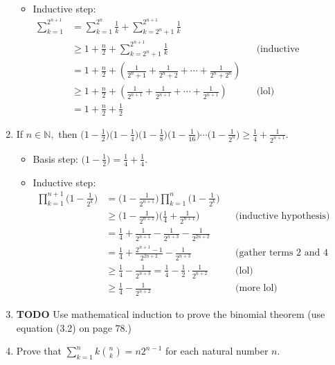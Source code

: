 \documentclass[11pt, oneside]{amsart}
\begin{document}
\begin{enumerate}
\begin{itemize}
\item Inductive step: 
\begin{align*}
\sum_{k=1}^{2^{n+1}} &=  \sum_{k=1}^{2^n} \frac{1}{k} + \sum_{k=2^n +1}^{2^{n+1}} \frac{1}{k} && \\
&\geq  1 + \frac{n}{2} + \sum_{k=2^n +1}^{2^{n+1}} \frac{1}{k} &&\text{(inductive hypothesis)} \\
&= 1 + \frac{n}{2} + \left( \frac{1}{2^n+1} + \frac{1}{2^n+2} + \dotsb + \frac{1}{2^n+2^n} \right) && \\
&\geq 1 + \frac{n}{2} + \left( \frac{1}{2^{n+1}} + \frac{1}{2^{n+1}} + \dotsb + \frac{1}{2^{n+1}} \right) &&\text{(lol)} \\
&= 1+ \frac{n}{2}+ \frac{1}{2}
\end{align*}
\end{itemize}
\item If \(n \in \mathbb{N},\) then \(\big( 1-\frac{1}{2} \big) \big( 1-\frac{1}{4} \big) \big( 1-\frac{1}{8} \big) \big( 1-\frac{1}{16} \big) \dotsb \big( 1-\frac{1}{2^n} \big) \geq \frac{1}{4} + \frac{1}{2^{n+1}}.\)
\label{sec:orgd62cd52}
\begin{itemize}
\item Basis step: \(\big( 1 - \tfrac{1}{2} \big) = \tfrac{1}{4} + \tfrac{1}{4}.\)
\item Inductive step: 
\begin{align*}
\prod_{k=1}^{n+1} \big( 1 - \tfrac{1}{2^k} \big) &= \big( 1 - \tfrac{1}{2^{n+1}} \big) \prod_{k=1}^n \big( 1 -
\tfrac{1}{2^k} \big) && \\
&\geq \big( 1 - \tfrac{1}{2^{n+1}} \big) \big( \tfrac{1}{4} + \tfrac{1}{2^{n+1}} \big) &&\text{(inductive hypothesis)} \\
&= \tfrac{1}{4} + \tfrac{1}{2^{n+1}} - \tfrac{1}{2^{n+3}} - \tfrac{1}{2^{2n+2}} && \\
&= \tfrac{1}{4} + \tfrac{2^{n+1}-1}{2^{2n+2}} - \tfrac{1}{2^{n+3}} &&\text{(gather terms 2 and 4 together)} \\
&\geq \tfrac{1}{4} - \tfrac{1}{2^{n+3}} = \tfrac{1}{4} - \tfrac{1}{2} \cdot \tfrac{1}{2^{n+2}} &&\text{(lol)} \\
&\geq \tfrac{1}{4} - \tfrac{1}{2^{n+2}} &&\text{(more lol)}
\end{align*}
\end{itemize}
\item {\bfseries\sffamily TODO} Use mathematical induction to prove the binomial theorem (use equation (3.2) on page 78.)
\label{sec:org3a155cb}
\item Prove that \(\sum_{k=1}^n k \binom{n}{k} = n 2^{n-1}\) for each natural number \(n.\)

\end{enumerate}
\end{document}
